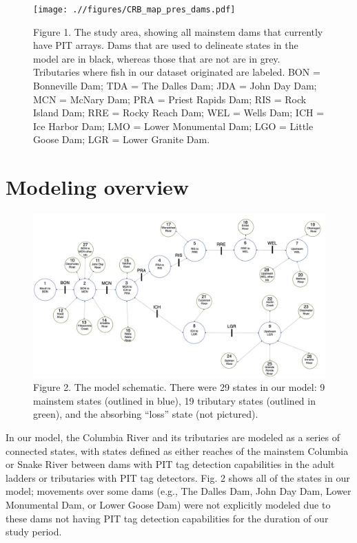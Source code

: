 \documentclass[
  12pt,
]{report}
\begin{document}
\begin{figure}
\centering
\texttt{[image: .//figures/CRB\_map\_pres\_dams.pdf]}
\caption{Figure 1. The study area, showing all mainstem dams that
currently have PIT arrays. Dams that are used to delineate states in the
model are in black, whereas those that are not are in grey. Tributaries
where fish in our dataset originated are labeled. BON = Bonneville Dam;
TDA = The Dalles Dam; JDA = John Day Dam; MCN = McNary Dam; PRA = Priest
Rapids Dam; RIS = Rock Island Dam; RRE = Rocky Reach Dam; WEL = Wells
Dam; ICH = Ice Harbor Dam; LMO = Lower Monumental Dam; LGO = Little
Goose Dam; LGR = Lower Granite Dam.}
\end{figure}

\hypertarget{modeling-overview}{%
\section{Modeling overview}\label{modeling-overview}}

\begin{figure}
\centering
\includegraphics[width=1\textwidth,height=\textheight]{.//figures/full_model_diagram.jpg}
\caption{Figure 2. The model schematic. There were 29 states in our
model: 9 mainstem states (outlined in blue), 19 tributary states
(outlined in green), and the absorbing ``loss'' state (not pictured).}
\end{figure}

In our model, the Columbia River and its tributaries are modeled as a
series of connected states, with states defined as either reaches of the
mainstem Columbia or Snake River between dams with PIT tag detection
capabilities in the adult ladders or tributaries with PIT tag detectors.
Fig. 2 shows all of the states in our model; movements over some dams
(e.g., The Dalles Dam, John Day Dam, Lower Monumental Dam, or Lower
Goose Dam) were not explicitly modeled due to these dams not having PIT
tag detection capabilities for the duration of our study period.
\end{document}
